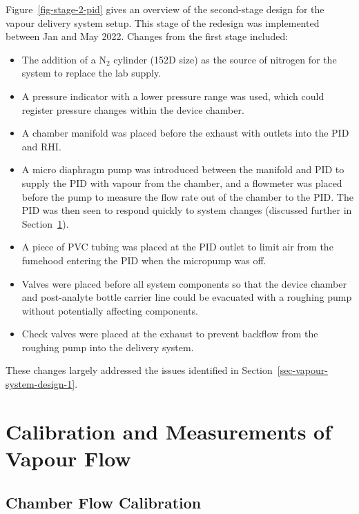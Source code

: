 \documentclass[
  a4paper,
]{scrbook}
\begin{document}
Figure~\ref{fig-stage-2-pid} gives an overview of the second-stage
design for the vapour delivery system setup. This stage of the redesign
was implemented between Jan and May 2022. Changes from the first stage
included:

\begin{itemize}
\item
  The addition of a N\(_2\) cylinder (152D size) as the source of
  nitrogen for the system to replace the lab supply.
\item
  A pressure indicator with a lower pressure range was used, which could
  register pressure changes within the device chamber.
\item
  A chamber manifold was placed before the exhaust with outlets into the
  PID and RHI.
\item
  A micro diaphragm pump was introduced between the manifold and PID to
  supply the PID with vapour from the chamber, and a flowmeter was
  placed before the pump to measure the flow rate out of the chamber to
  the PID. The PID was then seen to respond quickly to system changes
  (discussed further in Section~\ref{sec-calibration}).
\item
  A piece of PVC tubing was placed at the PID outlet to limit air from
  the fumehood entering the PID when the micropump was off.
\item
  Valves were placed before all system components so that the device
  chamber and post-analyte bottle carrier line could be evacuated with a
  roughing pump without potentially affecting components.
\item
  Check valves were placed at the exhaust to prevent backflow from the
  roughing pump into the delivery system.
\end{itemize}

These changes largely addressed the issues identified in
Section~\ref{sec-vapour-system-design-1}.

\hypertarget{sec-calibration}{%
\section{Calibration and Measurements of Vapour
Flow}\label{sec-calibration}}

\hypertarget{sec-flow-calibration}{%
\subsection{Chamber Flow Calibration}\label{sec-flow-calibration}}
\end{document}
